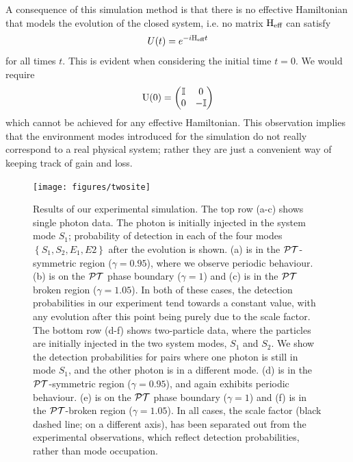 A consequence of this simulation method is that there is no effective
Hamiltonian that models the evolution of the closed system, i.e. no matrix
\(\mathrm{H}_{\text{eff}}\) can satisfy
\begin{equation}
  U\!\left(t\right) = e^{-i\mathrm{H}_{\text{eff}}t}
\end{equation}
for all times \(t\). This is evident when considering the initial time \(t=0\).
We would require
\begin{equation}
  \mathrm{U}\!\left(0\right) = \begin{pmatrix}
    \mathbb{I} & 0 \\
    0 & -\mathbb{I}
  \end{pmatrix}
\end{equation}
which cannot be achieved for any effective Hamiltonian. This observation implies
that the environment modes introduced for the simulation do not really
correspond to a real physical system; rather they are just a convenient way of
keeping track of gain and loss.

\begin{figure}[p]
  \centering
  \texttt{[image: figures/twosite]}
  \caption[Results of simulation]
    {Results of our experimental simulation. The top row (a-c) shows
    single photon data. The photon is initially injected in the system mode
    \(S_1\); probability of detection in each of the four modes \(\left\{S_1,
    S_2, E_1, E2\right\}\) after the evolution is shown. (a) is in the
    \(\mathcal{PT}{}\)-symmetric region (\(\gamma=0.95\)), where we observe periodic
    behaviour. (b) is on the \(\mathcal{PT}{}\) phase boundary (\(\gamma=1\)) and (c) is
    in the \(\mathcal{PT}{}\) broken region (\(\gamma=1.05\)). In both of these cases,
    the detection probabilities in our
    experiment tend towards a constant value, with any evolution after this
    point being purely due to the scale factor. The bottom row (d-f) shows
    two-particle data, where the particles are initially injected in the two
    system modes, \(S_1\) and \(S_2\). We show the detection probabilities for
    pairs where one photon is still in mode \(S_1\), and the other photon is in
    a different mode. (d) is in the \(\mathcal{PT}{}\)-symmetric region
    (\(\gamma=0.95\)), and again exhibits periodic behaviour. (e) is on the
    \(\mathcal{PT}{}\) phase boundary (\(\gamma=1\)) and (f) is in the \(\mathcal{PT}{}\)-broken
    region (\(\gamma=1.05\)). In all cases, the scale factor (black dashed
    line; on a different axis), has been separated out from the experimental
    observations, which reflect detection probabilities, rather than mode
    occupation.}
  \label{fig:twosite}
\end{figure}

